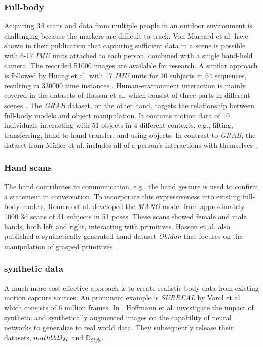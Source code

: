 \subsubsection{Full-body}
Acquiring 3d scans and data from multiple people in an outdoor environment is challenging because the markers are difficult to track. Von Marcard et al. have shown in their publication that capturing sufficient data in a scene is possible with 6-17 \emph{IMU} units attached to each person, combined with a single hand-held camera. The recorded 51000 images are available for research.\cite{vip} A similar approach is followed by Huang et al. with 17 \emph{IMU} units for 10 subjects in 64 sequences, resulting in 330000 time instances \cite{dip}. Human-environment interaction is mainly covered in the datasets of Hassan et al. which consist of three parts in different scenes \cite{prox}. The \emph{GRAB} dataset, on the other hand, targets the relationship between full-body models and object manipulation. It contains motion data of 10 individuals interacting with 51 objects in 4 different contexts, e.g., lifting, transferring, hand-to-hand transfer, and using objects\cite{grab}. In contrast to \emph{GRAB}, the dataset from Müller et al. includes all of a person's interactions with themselves \cite{tuch}.

\subsubsection{Hand scans}
The hand contributes to communication, e.g., the hand gesture is used to confirm a statement in conversation. To incorporate this expressiveness into existing full-body models, Romero et al. developed the \emph{MANO} model from approximately 1000 3d scans of 31 subjects in 51 poses. These scans showed female and male hands, both left and right, interacting with primitives. \cite{mano} 
Hasson et al. also published a synthetically generated hand dataset \emph{ObMan} that focuses on the manipulation of grasped primitives \cite{obman}.

\subsubsection{synthetic data}
A much more cost-effective approach is to create realistic body data from existing motion capture sources. An prominent example is \emph{SURREAL} by Varol et al. which consists of 6 million frames\cite{surreal}. In \cite{ltsh}, Hoffmann et al. investigate the impact of synthetic and synthetically augmented images on the capability of neural networks to generalize to real world data. They subsequently release their datasets, $\\mathbb{D}_{M}$ and $\mathbb{D}_{Style}$.

